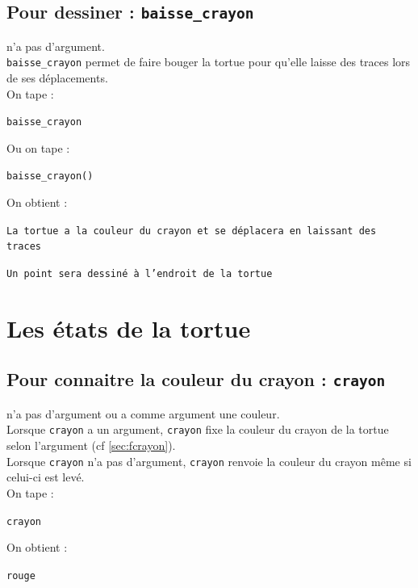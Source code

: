 \documentclass[a4paper,11pt]{book}
\begin{document}
\subsection{Pour dessiner : {\tt baisse\_crayon}}
 n'a pas d'argument.\\
{\tt baisse\_crayon} permet de faire bouger la tortue pour qu'elle laisse des 
traces lors de ses d\'eplacements.\\
On tape :
\begin{center}{\tt baisse\_crayon}\end{center}
Ou on tape :
\begin{center}{\tt baisse\_crayon()}\end{center}
On obtient :
\begin{center}{\tt La tortue a la couleur du crayon et se d\'eplacera en laissant des traces}\end{center}
\begin{center}{\tt Un point sera dessin\'e \`a l'endroit de la tortue}\end{center}

\section{Les \'etats de la tortue}
\subsection{Pour connaitre la couleur du crayon : {\tt crayon}}\label{sec:crayon}
 n'a pas d'argument ou a comme argument une couleur.\\
Lorsque {\tt crayon} a un argument, {\tt crayon} fixe la couleur du  crayon de la tortue selon l'argument (cf \ref{sec:fcrayon}).\\
Lorsque {\tt crayon} n'a pas d'argument, {\tt crayon} renvoie la 
couleur du crayon m\^eme si celui-ci est lev\'e.\\ 
On tape :
\begin{center}{\tt crayon}\end{center}
On obtient :
\begin{center}{\tt rouge}\end{center}
\end{document}
